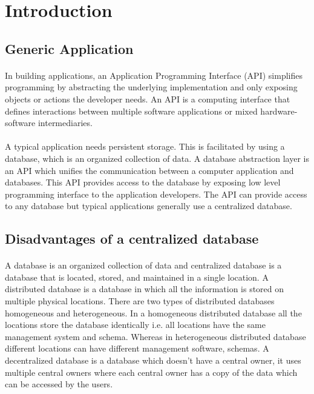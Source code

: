 \documentclass{article}
\begin{document}
\section{Introduction}
    \subsection{Generic Application}
        \paragraph{}
        In building applications, an Application Programming Interface (API) simplifies programming by abstracting the underlying implementation and only exposing objects or actions the developer needs. An API is a computing interface that defines interactions between multiple software applications or mixed hardware-software intermediaries. \cite{wiki}
        
        \paragraph{}
        A typical application needs persistent storage. This is facilitated by using a database, which is an organized collection of data. A database abstraction layer is an API which unifies the communication between a computer application and databases. This API provides access to the database by exposing low level programming interface to the application developers. The API can provide access to any database but typical applications generally use a centralized database.
        
    \subsection{Disadvantages of a centralized database}
        \paragraph{}
        A database is an organized collection of data and centralized database is a database that is located, stored, and maintained in a single location.
        A distributed database is a database in which all the information is stored on multiple physical locations. There are two types of distributed databases homogeneous and heterogeneous. In a homogeneous distributed database all the locations store the database identically i.e. all locations have the same management system and schema. Whereas in heterogeneous distributed database different locations can have different management software, schemas.
        A decentralized database is a database which doesn't have a central owner, it uses multiple central owners where each central owner has a copy of the data which can be accessed by the users. 
        \cite{wiki}
\end{document}
